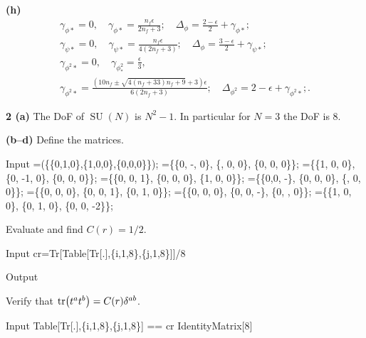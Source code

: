 \documentclass{article}
\makeatletter
\newcommand*{\shifttext}[1]{%
  \settowidth{\@tempdima}{#1}%
  \hspace{-\@tempdima}#1%
}
\newcommand{\plabel}[1]{%
\shifttext{\textbf{#1}\quad}%
}
\newcommand{\prule}{%
\begin{center}%
\hdashrule[0.5ex]{.99\linewidth}{1pt}{1pt 2.5pt}%
\end{center}%
}
\newcommand{\minusbaseline}{\abovedisplayskip=0pt\abovedisplayshortskip=0pt~\vspace*{-\baselineskip}}%
\makeatother
\begin{document}
\plabel{(h)}%
\begingroup\minusbaseline%
\begin{gather*}
    \gamma_{\phi*} = 0,\quad \gamma_{\phi*} = \frac{n_f\epsilon}{2n_f+3};\quad \Delta_{\phi} = \frac{2-\epsilon}{2} + \gamma_{\phi*}; \\
    \gamma_{\psi*} = 0,\quad \gamma_{\psi*} = \frac{n_f\epsilon}{4(2n_f+3)}; \quad \Delta_{\phi} = \frac{3-\epsilon}{2} + \gamma_{\psi*}; \\
    \gamma_{\phi^2*} = 0,\quad \gamma_{\phi^2_*} = \frac{\epsilon}{3},\\
    \gamma_{\phi^2*} = \frac{\left(10 n_f\pm \sqrt{4 (n_f+33) n_f+9}+3\right) \epsilon }{6 (2 n_f+3)};\quad \Delta_{\phi^2} = 2-\epsilon + \gamma_{\phi^2*};.
\end{gather*}
\endgroup

\prule
\plabel{2 (a)}%
The DoF of $\operatorname{SU}(N)$ is $N^2-1$.
In particular for $N=3$ the DoF is $8$.

\plabel{(b--d)}%
Define the matrices.
\begin{mmaCell}{Input}
=(\{\{0,1,0\},\{1,0,0\},\{0,0,0\}\});
=\{\{0, -, 0\}, \{, 0, 0\}, \{0, 0, 0\}\};
=\{\{1, 0, 0\}, \{0, -1, 0\}, \{0, 0, 0\}\};
=\{\{0, 0, 1\}, \{0, 0, 0\}, \{1, 0, 0\}\};
=\{\{0,0, -\}, \{0, 0, 0\}, \{, 0, 0\}\};
=\{\{0, 0, 0\}, \{0, 0, 1\}, \{0, 1, 0\}\};
=\{\{0, 0, 0\}, \{0, 0, -\}, \{0, , 0\}\};
=\{\{1, 0, 0\}, \{0, 1, 0\}, \{0, 0, -2\}\};
\end{mmaCell}

Evaluate and find $C(r)=1/2$.
\begin{mmaCell}[moredefined={cr},morefunctionlocal={i, j}]{Input}
cr=Tr[Table[Tr[.],\{i,1,8\},\{j,1,8\}]]/8
\end{mmaCell}

\begin{mmaCell}{Output}
\end{mmaCell}

Verify that $\tr(t^a t^b) = C(r)\delta^{ab}$.
\begin{mmaCell}[morefunctionlocal={i, j},moredefined={cr}]{Input}
Table[Tr[.],\{i,1,8\},\{j,1,8\}] == cr IdentityMatrix[8]
\end{mmaCell}
\end{document}
